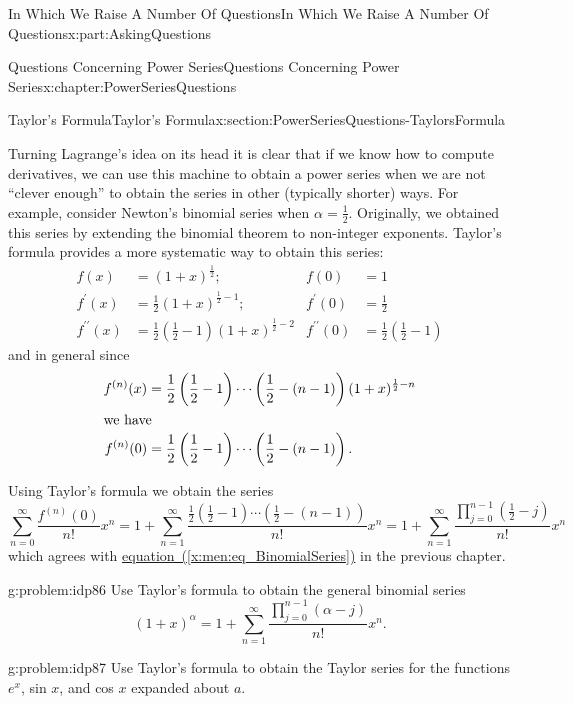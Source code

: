 \documentclass[oneside,10pt,]{book}
\newcommand{\xreffont}{\relax}
\numberwithin{equation}{section}
\newcommand{\amp}{&}
\begin{document}
\begin{partptx}{In Which We Raise A Number Of Questions}{}{In Which We Raise A Number Of Questions}{}{}{x:part:AskingQuestions}
\begin{chapterptx}{Questions Concerning Power Series}{}{Questions Concerning Power Series}{}{}{x:chapter:PowerSeriesQuestions}
\begin{sectionptx}{Taylor's Formula}{}{Taylor's Formula}{}{}{x:section:PowerSeriesQuestions-TaylorsFormula}
\par
Turning Lagrange's idea on its head it is clear that if we know how to compute derivatives, we can use this machine to obtain a power series when we are not ``clever enough'' to obtain the series in other (typically shorter) ways. For example, consider Newton's binomial series when \(\alpha=\frac{1}{2}\). Originally, we obtained this series by extending the binomial theorem to non-integer exponents. Taylor's formula provides a more systematic way to obtain this series:%
\begin{align*}
f(x)\amp =(1+x)^{\frac{1}{2}};\amp f(0)\amp =1\\
f^\prime(x)\amp =\frac{1}{2}(1+x)^{\frac{1}{2}-1};\amp  f^\prime(0)\amp =\frac{1}{2}\\
f^{\prime\prime}(x)\amp =\frac{1}{2}\left(\frac{1}{2}-1\right)(1+x)^{\frac{1}{2}-2}\amp f^{\prime\prime}(0)\amp =\frac{1}{2}\left(\frac{1}{2}-1\right)
\end{align*}
and in general since%
\begin{align*}
f^{(n)}(x)\amp =\frac{1}{2}\left(\frac{1}{2}-1\right)\cdots\left(\frac{1}{2}-(n-1)\right)(1+x)^{\frac{1}{2}-n}\\
\intertext{we have}
f^{(n)}(0)\amp =\frac{1}{2}\left(\frac{1}{2}-1\right)\cdots\left(\frac{1}{2}-(n-1)\right)\text{.}
\end{align*}
%
\par
Using Taylor's formula we obtain the series%
\begin{equation*}
\sum_{n=0}^\infty\frac{f^{(n)}(0)}{n!}x^n = 1+\sum_{n=1}^\infty\frac{\frac{1}{2}\left(\frac{1}{2}-1\right)\cdots\left( \frac{1}{2}-(n-1)\right)}{n!}x^n= 1+\sum_{n=1}^\infty\frac{\prod_{j=0}^{n-1}\left(\frac{1}{2}-j\right)}{n!}x^n
\end{equation*}
which agrees with \hyperref[x:men:eq_BinomialSeries]{equation~({\xreffont\ref{x:men:eq_BinomialSeries}})} in the previous chapter.%
\begin{problem}{}{g:problem:idp86}%
 Use Taylor's formula to obtain the general binomial series%
\begin{equation*}
(1+x)^\alpha=1+\sum_{n=1}^\infty\frac{\prod_{j=0}^{n-1}\left(\alpha-j\right)}{n!}x^n.{}
\end{equation*}
%
\end{problem}
\begin{problem}{}{g:problem:idp87}%
 Use Taylor's formula to obtain the Taylor series for the functions \(e^x\), sin \(x\), and cos \(x\) expanded about \(a\).%

\end{problem}
\end{sectionptx}
\end{chapterptx}
\end{partptx}
\end{document}
